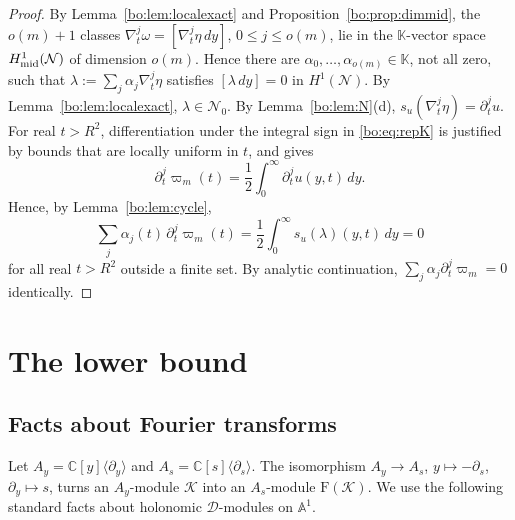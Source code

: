 \documentclass[11pt,a4paper]{article}
\theoremstyle{definition}
\theoremstyle{remark}
\numberwithin{equation}{section}
\newcommand{\C}{\mathbb{C}}
\newcommand{\Kt}{\mathbb{K}}
\newcommand{\A}{\mathbb{A}}
\newcommand{\cD}{\mathcal{D}}
\newcommand{\cN}{\mathcal{N}}
\newcommand{\Four}{\mathrm{F}}
\begin{document}
\begin{proof}
By Lemma~\ref{bo:lem:localexact} and Proposition~\ref{bo:prop:dimmid}, the $o(m)+1$ classes $\nabla_t^j\omega=[\nabla_t^j\eta\,dy]$, $0\le j\le o(m)$, lie in the $\Kt$-vector space $H^1_{\rm mid}(\cN)$ of dimension $o(m)$. Hence there are $\alpha_0,\dots,\alpha_{o(m)}\in\Kt$, not all zero, such that $\lambda:=\sum_j\alpha_j\nabla_t^j\eta$ satisfies $[\lambda\,dy]=0$ in $H^1(\cN)$. By Lemma~\ref{bo:lem:localexact}, $\lambda\in\cN_0$. By Lemma~\ref{bo:lem:N}(d), $s_u(\nabla_t^j\eta)=\partial_t^ju$. For real $t>R^2$, differentiation under the integral sign in \eqref{bo:eq:repK} is justified by bounds that are locally uniform in $t$, and gives
\[
\partial_t^j\varpi_m(t)=\frac12\int_0^\infty\partial_t^ju(y,t)\,dy .
\]
Hence, by Lemma~\ref{bo:lem:cycle},
\[
\sum_j\alpha_j(t)\,\partial_t^j\varpi_m(t)=\frac12\int_0^\infty s_u(\lambda)(y,t)\,dy=0
\]
for all real $t>R^2$ outside a finite set. By analytic continuation, $\sum_j\alpha_j\partial_t^j\varpi_m=0$ identically.
\end{proof}

\section{The lower bound}\label{bo:sec:lower}

\subsection{Facts about Fourier transforms}
Let $A_y=\C[y]\langle\partial_y\rangle$ and $A_s=\C[s]\langle\partial_s\rangle$. The isomorphism $A_y\to A_s$, $y\mapsto-\partial_s$, $\partial_y\mapsto s$, turns an $A_y$-module $\mathcal K$ into an $A_s$-module $\Four(\mathcal K)$. We use the following standard facts about holonomic $\cD$-modules on $\A^1$.
\end{document}
